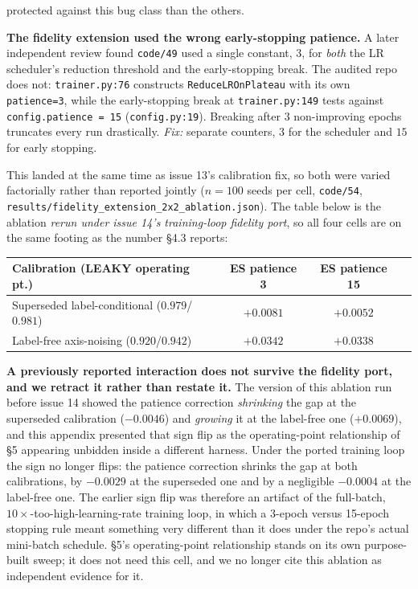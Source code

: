 \documentclass[10pt]{article} %
\begin{document}
\begin{description}
  protected against this bug class than the others.
\item[12.] \textbf{The fidelity extension used the wrong early-stopping
  patience.} A later independent review found
  \texttt{code/49} used a single constant, $3$, for \emph{both} the LR
  scheduler's reduction threshold and the early-stopping break. The
  audited repo does not: \texttt{trainer.py:76} constructs
  \texttt{ReduceLROnPlateau} with its own \texttt{patience=3}, while the
  early-stopping break at \texttt{trainer.py:149} tests against
  \texttt{config.patience = 15} (\texttt{config.py:19}). Breaking after 3
  non-improving epochs truncates every run drastically. \textit{Fix:}
  separate counters, $3$ for the scheduler and $15$ for early stopping.

  This landed at the same time as issue 13's calibration fix, so both
  were varied factorially rather than reported jointly
  ($n=100$ seeds per cell, \texttt{code/54},
  \texttt{results/fidelity\_extension\_2x2\_ablation.json}). The table below
  is the ablation \emph{rerun under issue 14's training-loop fidelity port},
  so all four cells are on the same footing as the number §4.3 reports:

  \begin{center}\small
  \begin{tabular}{lccc}
  \toprule
  Calibration (LEAKY operating pt.) & ES patience 3 & ES patience 15 \\
  \midrule
  Superseded label-conditional ($0.979$/$0.981$) & $+0.0081$ & $+0.0052$ \\
  Label-free axis-noising ($0.920$/$0.942$) & $+0.0342$ & $\mathbf{+0.0338}$ \\
  \bottomrule
  \end{tabular}
  \end{center}

  \textbf{A previously reported interaction does not survive the fidelity
  port, and we retract it rather than restate it.} The version of this
  ablation run before issue 14 showed the patience correction \emph{shrinking}
  the gap at the superseded calibration ($-0.0046$) and \emph{growing} it at
  the label-free one ($+0.0069$), and this appendix presented that sign flip
  as the operating-point relationship of §5 appearing unbidden inside a
  different harness. Under the ported training loop the sign no longer flips:
  the patience correction shrinks the gap at both calibrations, by $-0.0029$
  at the superseded one and by a negligible $-0.0004$ at the label-free one.
  The earlier sign flip was therefore an artifact of the full-batch,
  $10\times$-too-high-learning-rate training loop, in which a 3-epoch versus
  15-epoch stopping rule meant something very different than it does under
  the repo's actual mini-batch schedule. §5's operating-point relationship
  stands on its own purpose-built sweep; it does not need this cell, and we no
  longer cite this ablation as independent evidence for it.


\end{description}
\end{document}
